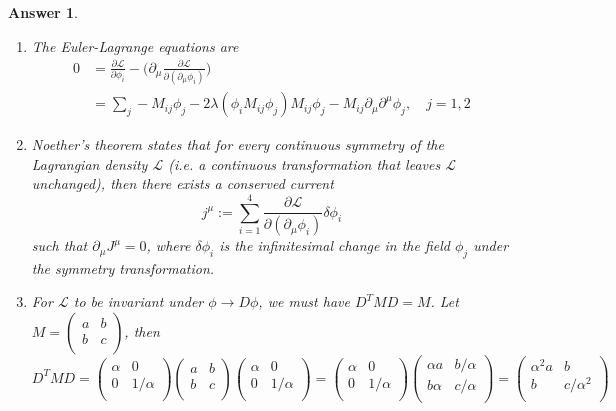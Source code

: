 \documentclass[a4paper]{article}
\newtheorem{ans}{Answer}[section]
\theoremstyle{new}
\begin{document}
\begin{ans}\leavevmode
\begin{enumerate}[label=(\alph*)]
\item The Euler-Lagrange equations are
\begin{align}
    0&=\frac{\partial\mathcal{L}}{\partial\phi_i}-\bigg(\partial_\mu\frac{\partial\mathcal{L}}{\partial(\partial_\mu\phi_i)}\bigg)\nonumber\\&=\sum_j-M_{ij}\phi_j-2\lambda(\phi_iM_{ij}\phi_j)M_{ij}\phi_j-M_{ij}\partial_\mu\partial^\mu \phi_j,\quad j=1,2\nonumber
\end{align}
\item Noether's theorem states that for every continuous symmetry of the Lagrangian density $\mathcal{L}$ (i.e. a continuous transformation that leaves $\mathcal{L}$ unchanged), then there exists a conserved current
$$j^\mu:=\sum_{i=1}^4\frac{\partial\mathcal{L}}{\partial(\partial_\mu\phi_i)}\delta\phi_i$$
such that $\partial_\mu J^\mu=0$, where $\delta\phi_i$ is the infinitesimal change in the field $\phi_j$ under the symmetry transformation.
\item For $\mathcal{L}$ to be invariant under $\phi\rightarrow D\phi$, we must have $D^TMD=M$. Let $M=\begin{pmatrix}a&b\\b&c\\\end{pmatrix}$, then
$$D^TMD=\begin{pmatrix}\alpha&0\\0&1/\alpha\\\end{pmatrix}\begin{pmatrix}a&b\\b&c\\\end{pmatrix}\begin{pmatrix}\alpha&0\\0&1/\alpha\\\end{pmatrix}=\begin{pmatrix}\alpha&0\\0&1/\alpha\\\end{pmatrix}\begin{pmatrix}\alpha a&b/\alpha\\b\alpha&c/\alpha\\\end{pmatrix}=\begin{pmatrix}\alpha^2a&b\\b&c/\alpha^2\\\end{pmatrix}$$

\end{enumerate}
\end{ans}
\end{document}
